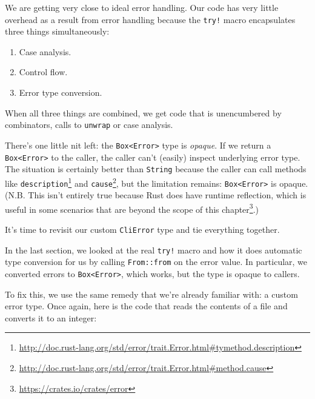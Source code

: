 \documentclass[a4paper,]{book}
\renewcommand{\href}[2]{#2\footnote{\url{#1}}}
\providecommand{\tightlist}{%
  \setlength{\itemsep}{0pt}\setlength{\parskip}{0pt}}
\begin{document}
We are getting very close to ideal error handling. Our code has very
little overhead as a result from error handling because the
\texttt{try!} macro encapsulates three things simultaneously:

\begin{enumerate}
\def\labelenumi{\arabic{enumi}.}
\tightlist
\item
  Case analysis.
\item
  Control flow.
\item
  Error type conversion.
\end{enumerate}

When all three things are combined, we get code that is unencumbered by
combinators, calls to \texttt{unwrap} or case analysis.

There's one little nit left: the
\texttt{Box\textless{}Error\textgreater{}} type is \emph{opaque}. If we
return a \texttt{Box\textless{}Error\textgreater{}} to the caller, the
caller can't (easily) inspect underlying error type. The situation is
certainly better than \texttt{String} because the caller can call
methods like
\href{http://doc.rust-lang.org/std/error/trait.Error.html\#tymethod.description}{\texttt{description}}
and
\href{http://doc.rust-lang.org/std/error/trait.Error.html\#method.cause}{\texttt{cause}},
but the limitation remains: \texttt{Box\textless{}Error\textgreater{}}
is opaque. (N.B. This isn't entirely true because Rust does have runtime
reflection, which is useful in some scenarios that are
\href{https://crates.io/crates/error}{beyond the scope of this
chapter}.)

It's time to revisit our custom \texttt{CliError} type and tie
everything together.


In the last section, we looked at the real \texttt{try!} macro and how
it does automatic type conversion for us by calling \texttt{From::from}
on the error value. In particular, we converted errors to
\texttt{Box\textless{}Error\textgreater{}}, which works, but the type is
opaque to callers.

To fix this, we use the same remedy that we're already familiar with: a
custom error type. Once again, here is the code that reads the contents
of a file and converts it to an integer:
\end{document}

